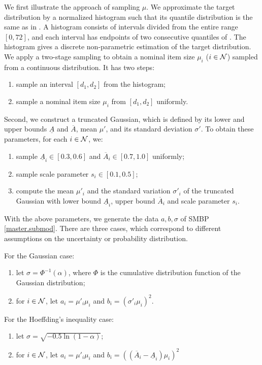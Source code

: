 We first illustrate the approach of sampling $\mu$. We approximate the target distribution by a normalized histogram such that its quantile distribution is the same as in . A histogram consists of intervals divided from the entire range $[0,72]$, and each interval has endpoints of two consecutive quantiles of . The histogram gives a discrete non-parametric estimation of the target distribution. We apply a two-stage sampling to obtain a nominal item size $\mu_i$ ($ i\in \mathcal N$) sampled from a continuous distribution. It has two steps:

\begin{enumerate}
    \item sample an interval $[d_1,d_2]$ from the histogram;
    \item sample a nominal item size $\mu_i$ from $[d_1,d_2]$ uniformly.
\end{enumerate}

Second, we construct a truncated Gaussian, which is defined by its lower and upper bounds $\underline{A}$ and $\overline{A}$, mean  $\mu'$, and its standard deviation $\sigma'$. To obtain these parameters, for each $i \in \mathcal N$,  we:

\begin{enumerate}
    \item sample $\underline{A}_i \in [0.3, 0.6]$ and $\overline{A}_i \in [0.7, 1.0]$ uniformly;
    \item sample scale parameter $s_i \in [0.1, 0.5]$;
    \item compute the mean $\mu'_i$ and the standard variation $\sigma'_i$ of the truncated Gaussian with lower bound $\underline{A}_i$, upper bound $\overline{A}_i$ and scale parameter $s_i$.
\end{enumerate}

With the above parameters, we generate the data  $a,b, \sigma$ of SMBP \eqref{master.submod}. There are three cases, which correspond to different assumptions on the uncertainty or probability distribution.

For the Gaussian case:
\begin{enumerate}
    \item let $\sigma = \Phi^{-1}(\alpha)$, where $\Phi$ is the cumulative distribution function  of the Gaussian distribution;
    \item for $i \in \mathcal N$, let $a_i = \mu'_i \mu_i$ and $b_i = {(\sigma'_i \mu_i)}^2$.
\end{enumerate}

For the Hoeffding’s inequality case:
\begin{enumerate}
    \item let $\sigma = \sqrt{-0.5\ln{(1- \alpha)}}$;
    \item for $i \in \mathcal N$, let $a_i = \mu'_i \mu_i$ and $b_i = {((\overline{A}_i-\underline{A}_i) \mu_i)}^2$
\end{enumerate}

